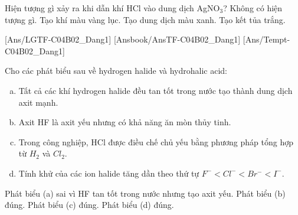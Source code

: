 \documentclass[Main.tex]{subfiles}
\begin{document}
    \begin{ex}
    Hiện tượng gì xảy ra khi dẫn khí HCl vào dung dịch AgNO$_3$?
    \choice
    {Không có hiện tượng gì.}
    {Tạo khí màu vàng lục.}
    {Tạo dung dịch màu xanh.}
    {\True Tạo kết tủa trắng.}
    \end{ex}
    
    [Ans/LGTF-C04B02_Dang1]
    [Ansbook/AnsTF-C04B02_Dang1]
    [Ans/Tempt-C04B02_Dang1]
    \begin{ex}%
        Cho các phát biểu sau về hydrogen halide và hydrohalic acid:
        \begin{enumerate}[(a)]
            \item Tất cả các khí hydrogen halide đều tan tốt trong nước tạo thành dung dịch axit mạnh.
            \item Axit HF là axit yếu nhưng có khả năng ăn mòn thủy tinh.
            \item Trong công nghiệp, HCl được điều chế chủ yếu bằng phương pháp tổng hợp từ $H_2$ và $Cl_2$.
            \item Tính khử của các ion halide tăng dần theo thứ tự $F^- < Cl^- < Br^- < I^-$.
        \end{enumerate}
        \choiceTF
        {Phát biểu (a) sai vì HF tan tốt trong nước nhưng tạo axit yếu.}
        {\True Phát biểu (b) đúng.}
        {\True Phát biểu (c) đúng.}
        {\True Phát biểu (d) đúng.}
    \end{ex}
    
\end{document}
